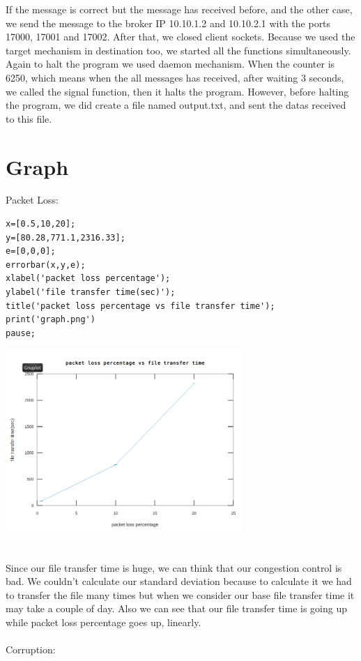\documentclass[conference]{IEEEtran}
\begin{document}
If the message is correct but the message has received before, and the other case, we send the message to the broker IP 10.10.1.2 and 10.10.2.1 with the ports 17000, 17001 and 17002. After that, we closed client sockets.
Because we used the target mechanism in destination too, we started all the functions simultaneously. \\

Again to halt the program we used daemon mechanism. When the counter is 6250, which means when the all messages has received, after waiting 3 seconds, we called the signal function, then it halts the program.
However, before halting the program, we did create a file named output.txt, and sent the datas received to this file.

\section{Graph}
Packet Loss:
\begin{verbatim}
x=[0.5,10,20];
y=[80.28,771.1,2316.33];
e=[0,0,0];
errorbar(x,y,e);
xlabel('packet loss percentage');
ylabel('file transfer time(sec)');
title('packet loss percentage vs file transfer time');
print('graph.png')
pause;
\end{verbatim}

\includegraphics[width=9cm,scale=0.25]{loss.png}\\[0.1cm]
\\
\\

Since our file transfer time is huge, we can think that our congestion control is bad. We couldn't calculate our standard deviation because to calculate it we had to transfer the file many times but when we consider our base file transfer time it may take a couple of day. Also we can see that our file transfer time is going up while packet loss percentage goes up, linearly.
\\
\\
Corruption: 
\end{document}
